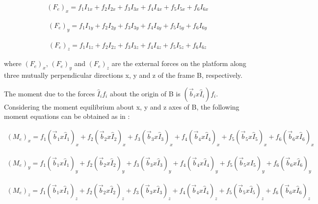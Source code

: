 \begin{ceqn}
	\begin{align}
	(F_e)_x = f_1I_{1x} + f_2I_{2x} + f_3I_{3x} + f_4I_{4x} + f_5I_{5x} + f_6I_{6x}
\end{align}
\end{ceqn}
\begin{ceqn}
	\begin{align}
	(F_e)_y = f_1I_{1y} + f_2I_{2y} + f_3I_{3y} + f_4I_{4y} + f_5I_{5y} + f_6I_{6y}
\end{align}
\end{ceqn}
\begin{ceqn}
	\begin{align}
	(F_e)_z = f_1I_{1z} + f_2I_{2z} + f_3I_{3z} + f_4I_{4z} + f_5I_{5z} + f_6I_{6z}
\end{align}
\end{ceqn}
where $(F_e)_x$, $(F_e)_y$ and $(F_e)_z$ are the external forces on the platform along three mutually perpendicular directions x, y and z of the frame B, respectively.

The moment due to the forces $\hat{I}_if_i$ about the origin of B is $(\vec{b}_i x \hat{I}_i)f_i$. Considering the moment equilibrium about x, y and z axes of B, the following moment equations can be obtained as in \cite{dwarakanath_design_2001}:

\begin{ceqn}
	\begin{align}
	(M_e)_x = f_1(\vec{b}_1 x \hat{I}_1)_x + f_2(\vec{b}_2 x \hat{I}_2)_x + f_3(\vec{b}_3 x \hat{I}_3)_x + f_4(\vec{b}_4 x \hat{I}_4)_x + f_5(\vec{b}_5 x \hat{I}_5)_x + f_6(\vec{b}_6 x \hat{I}_6)_x
\end{align}
\end{ceqn}
\begin{ceqn}
	\begin{align}
	(M_e)_y = f_1(\vec{b}_1 x \hat{I}_1)_y + f_2(\vec{b}_2 x \hat{I}_2)_y + f_3(\vec{b}_3 x \hat{I}_3)_y + f_4(\vec{b}_4 x \hat{I}_4)_y + f_5(\vec{b}_5 x \hat{I}_5)_y + f_6(\vec{b}_6 x \hat{I}_6)_y
	\end{align}
\end{ceqn}
\begin{ceqn}
	\begin{align}
	(M_e)_z = f_1(\vec{b}_1 x \hat{I}_1)_z + f_2(\vec{b}_2 x \hat{I}_2)_z + f_3(\vec{b}_3 x \hat{I}_3)_z + f_4(\vec{b}_4 x \hat{I}_4)_z + f_5(\vec{b}_5 x \hat{I}_5)_z + f_6(\vec{b}_6 x \hat{I}_6)_z
	\end{align}
\end{ceqn}

